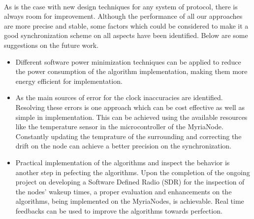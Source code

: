 \documentclass[a4paper,10pt]{report}
\begin{document}
\paragraph*{}
As is the case with new design techniques for any system of protocol, there is always room for improvement. Although the performance of all our approaches are more precise and stable,  some factors which could be considered to make it a good synchronization scheme on all aspects have been identified. Below are some suggestions on the future work.
\begin{itemize}
\item
Different software power minimization techniques can be applied to reduce the power consumption of the algorithm implementation, making them more energy efficient for implementation.
\item  As the main sources of error for the clock inaccuracies are identified. Resolving these errors is one approach which can be cost effective as well as simple in implementation. This can be achieved using the available resources like the temperature sensor in the microcontroller of the MyriaNode. Constantly updating the temprature of the surrounding and correcting the drift on the node can achieve a better precision on the synchronization.
\item
Practical implementation of the algorithms and inspect the behavior is another step in pefecting the algorithms. Upon the completion of the ongoing project on developing a Software Defined Radio (SDR) for the inspection of the nodes' wakeup times, a proper evaluation and enhancements on the algorithms, being implemented on the MyriaNodes, is achievable. Real time feedbacks can be used to improve the algorithms towards perfection.
\end{itemize}
\appendix
\end{document}
